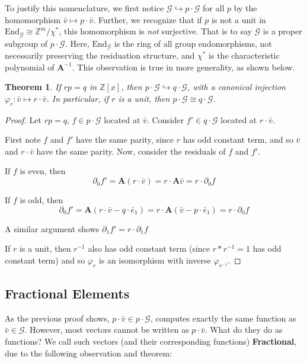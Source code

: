 \documentclass{article}
\newcommand{\G}{\mathcal{G}}
\newcommand{\Z}{\mathbb{Z}}
\newcommand{\2}{\textbf{2}}
\newcommand{\Am}{\textbf{A}}
\newcommand{\del}{\partial}
\newcommand{\vv}{\bar{v}}
\newcommand{\e}{\bar{e}}
\newtheorem{thm}{Theorem}
\theoremstyle{definition}
\begin{document}
To justify this nomenclature, we first notice 
$\G \hookrightarrow p \cdot \G$ for all $p$ by the
homomorphism $\vv \mapsto p \cdot \vv$. 
Further, we recognize that if $p$ is not a unit in 
$\text{End}_{\G} \cong \Z^m / \chi^*$, this homomorphism is \emph{not} 
surjective. That is to say $\G$ is a proper subgroup of $p \cdot \G$.
Here, $\text{End}_{\G}$ is the ring of all group endomorphisms, not 
necessarily preserving the residuation structure, and $\chi^*$ is the
characteristic polynomial of $\Am^{-1}$. 
This observation is true in more generality, as shown below.

\begin{thm}
  If $rp = q$ in $\Z[x]$, then $p \cdot \G \hookrightarrow q \cdot \G$, 
  with a canonical injection $\varphi_r : \vv \mapsto r \cdot \vv$. 
  In particular, if $r$ is a unit, then $p \cdot \G \cong q \cdot \G$.
\end{thm}

\begin{proof}
  Let $rp = q$, $f \in p \cdot \G$ located at $\vv$. 
  Consider $f' \in q \cdot \G$ located at $r \cdot \vv$.

  First note $f$ and $f'$ have the same parity, since 
  $r$ has odd constant term, and so $\vv$ and $r \cdot \vv$
  have the same parity. Now, consider the residuals of $f$ and $f'$. 
  
  If $f$ is even, then 
  \[ \del_0 f' = \Am (r \cdot \vv) = r \cdot \Am \vv = r \cdot \del_0 f \]

  If $f$ is odd, then
  \[ \del_0 f' = \Am (r \cdot \vv - q \cdot \e_1) 
               = r \cdot \Am (\vv - p \cdot \e_1)
               = r \cdot \del_0 f \]

  A similar argument shows $\del_1 f' = r \cdot \del_1 f$

  If $r$ is a unit, then $r^{-1}$ also has odd constant term 
  (since $r * r^{-1} = 1$ has odd constant term) and so $\varphi_r$
  is an isomorphism with inverse $\varphi_{r^{-1}}$.
\end{proof}

\subsection{Fractional Elements}
As the previous proof shows, $p \cdot \vv \in p \cdot \G$, 
computes exactly the same function as $\vv \in \G$.
However, most vectors cannot be written as $p \cdot \vv$. 
What do they do as functions?
We call such vectors (and their corresponding functions)
\textbf{Fractional}, due to the following observation and theorem:
\end{document}

